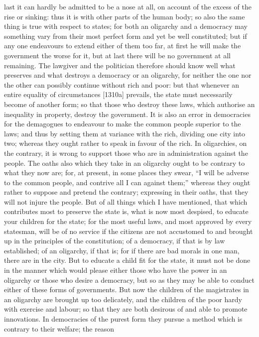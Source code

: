 last it can hardly be admitted to be a nose at all, on account of the
excess of the rise or sinking: thus it is with other parts of the human
body; so also the same thing is true with respect to states; for both an
oligarchy and a democracy may something vary from their most perfect form
and yet be well constituted; but if any one endeavours to extend either of
them too far, at first he will make the government the worse for it, but
at last there will be no government at all remaining. The lawgiver and the
politician therefore should know well what preserves and what destroys a
democracy or an oligarchy, for neither the one nor the other can possibly
continue without rich and poor: but that whenever an entire equality of
circumstances [1310a] prevails, the state must necessarily become of
another form; so that those who destroy these laws, which authorise an
inequality in property, destroy the government. It is also an error in
democracies for the demagogues to endeavour to make the common people
superior to the laws; and thus by setting them at variance with the rich,
dividing one city into two; whereas they ought rather to speak in favour
of the rich. In oligarchies, on the contrary, it is wrong to support those
who are in administration against the people. The oaths also which they
take in an oligarchy ought to be contrary to what they now are; for, at
present, in some places they swear, ``I will be adverse to the common
people, and contrive all I can against them;'' whereas they ought rather to
suppose and pretend the contrary; expressing in their oaths, that they
will not injure the people. But of all things which I have mentioned, that
which contributes most to preserve the state is, what is now most
despised, to educate your children for the state; for the most useful
laws, and most approved by every statesman, will be of no service if the
citizens are not accustomed to and brought up in the principles of the
constitution; of a democracy, if that is by law established; of an
oligarchy, if that is; for if there are bad morals in one man, there are
in the city. But to educate a child fit for the state, it must not be done
in the manner which would please either those who have the power in an
oligarchy or those who desire a democracy, but so as they may be able to
conduct either of these forms of governments. But now the children of the
magistrates in an oligarchy are brought up too delicately, and the
children of the poor hardy with exercise and labour; so that they are both
desirous of and able to promote innovations. In democracies of the purest
form they pursue a method which is contrary to their welfare; the reason
